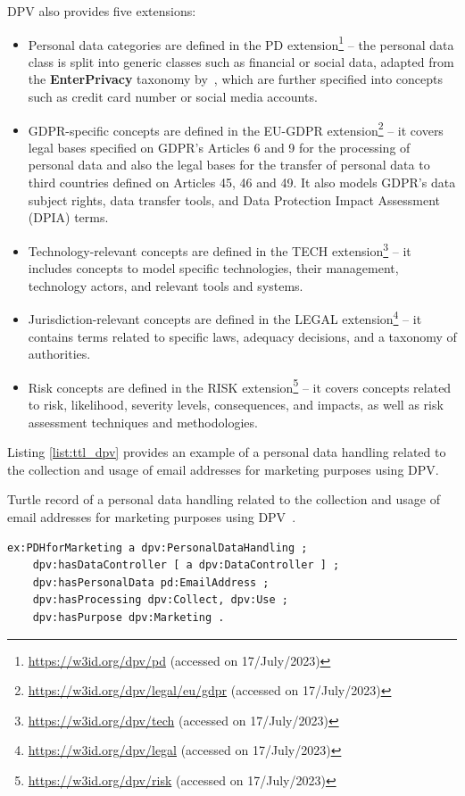 DPV also provides five extensions:
\begin{itemize}
    \item Personal data categories are defined in the PD extension\footnote{\url{https://w3id.org/dpv/pd} (accessed on 17/July/2023)} -- the personal data class is split into generic classes such as financial or social data, adapted from the \textbf{EnterPrivacy} taxonomy by~\cite{cronk_categories_2017}, which are further specified into concepts such as credit card number or social media accounts.
    \item GDPR-specific concepts are defined in the EU-GDPR extension\footnote{\url{https://w3id.org/dpv/legal/eu/gdpr} (accessed on 17/July/2023)} -- it covers legal bases specified on GDPR's Articles 6 and 9 for the processing of personal data and also the legal bases for the transfer of personal data to third countries defined on Articles 45, 46 and 49. It also models GDPR's data subject rights, data transfer tools, and Data Protection Impact Assessment (DPIA) terms.
    \item Technology-relevant concepts are defined in the TECH extension\footnote{\url{https://w3id.org/dpv/tech} (accessed on 17/July/2023)} -- it includes concepts to model specific technologies, their management, technology actors, and relevant tools and systems.
    \item Jurisdiction-relevant concepts are defined in the LEGAL extension\footnote{\url{https://w3id.org/dpv/legal} (accessed on 17/July/2023)} -- it contains terms related to specific laws, adequacy decisions, and a taxonomy of authorities.
    \item Risk concepts are defined in the RISK extension\footnote{\url{https://w3id.org/dpv/risk} (accessed on 17/July/2023)} -- it covers concepts related to risk, likelihood, severity levels, consequences, and impacts, as well as risk assessment techniques and methodologies.
\end{itemize}

Listing \ref{list:ttl_dpv} provides an example of a personal data handling related to the collection and usage of email addresses for marketing purposes using DPV.

\begin{listing}[ht]
\caption[Personal data handling modelling with DPV.]{Turtle record of a personal data handling related to the collection and usage of email addresses for marketing purposes using DPV~\citep{panetto_creating_2019}.}
\label{list:ttl_dpv}
\begin{verbatim}
ex:PDHforMarketing a dpv:PersonalDataHandling ;
    dpv:hasDataController [ a dpv:DataController ] ;
    dpv:hasPersonalData pd:EmailAddress ;
    dpv:hasProcessing dpv:Collect, dpv:Use ;
    dpv:hasPurpose dpv:Marketing .
\end{verbatim}
\end{listing}

